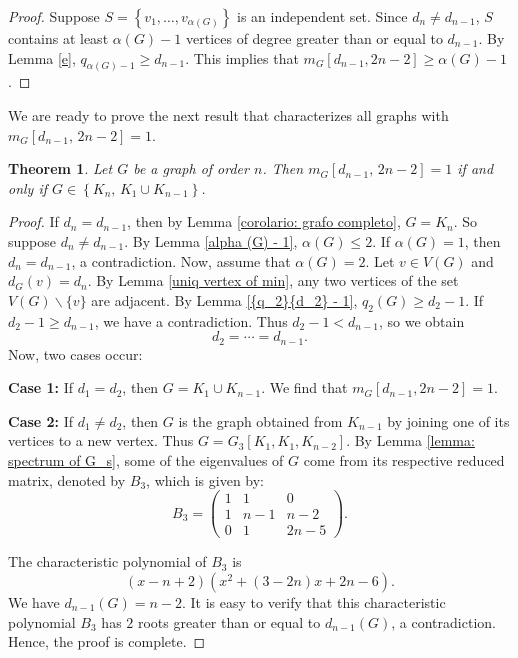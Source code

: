\documentclass[preprint,12pt]{elsarticle}
\newtheorem{theorem}{Theorem}[section]
\begin{document}
\begin{proof}
 Suppose $S = \left\{ {{v_1}, \ldots ,{v_{\alpha (G)}}} \right\}$ is an independent set. Since ${d_n} \ne {d_{n - 1}}$, $S$ contains at least $\alpha (G) - 1$ vertices of degree greater than or equal to ${d_{n - 1}}$. By Lemma \ref{e}, ${q_{\alpha (G) - 1}} \ge {d_{n - 1}}$. This implies that ${m_G}\left[ {{d_{n - 1}},2n - 2} \right] \ge \alpha (G) - 1$.
\end{proof}

We are ready to prove the next result that characterizes all graphs with $m_{G}[{d_{n-1}},\,2n-2] = 1$.

\begin{theorem}
Let $G$ be a graph of order $n$. Then ${m_G}[{d_{n - 1}},\,2n-2] = 1$ if and only if $G \in \left\{ {{K_n},\,{K_1} \cup {K_{n - 1}}} \right\}$.
\end{theorem}

\begin{proof}
If ${d_n} = {d_{n - 1}}$, then by Lemma \ref{corolario: grafo completo}, $G = {K_n}$. So suppose ${d_n} \ne {d_{n - 1}}$. By Lemma \ref{alpha (G) - 1}, $\alpha (G) \le 2$. If $\alpha (G) = 1$, then ${d_n} = {d_{n - 1}}$, a contradiction. Now, assume that $\alpha (G) = 2$. Let $v \in V(G)$ and ${d_G}(v) = {d_n}$. By Lemma \ref{uniq vertex of min}, any two vertices of the set $V(G)\backslash \{ v\} $ are adjacent. By Lemma \ref{{q_2}{d_2} - 1}, ${q_2(G)} \ge {d_2} - 1$. If ${d_2} - 1 \ge {d_{n - 1}}$, we have a contradiction. Thus ${d_2} - 1 < {d_{n - 1}}$, so we obtain 
$${d_2} = \cdots = {d_{n - 1}}.$$
Now, two cases occur:

 \noindent\textbf{Case 1:} If ${d_1} = {d_2}$, then $G = {K_1} \cup {K_{n - 1}}$. We find that ${m_G}\left[ {{d_{n - 1}},2n - 2} \right] = 1$.
 
 \noindent\textbf{Case 2:} If ${d_1} \ne {d_2}$, then $G$ is the graph obtained from ${K_{n - 1}}$ by joining one of its vertices to a new vertex. Thus $G = {G_3}\left[ {{K_1},{K_1},{K_{n - 2}}} \right]$. By Lemma \ref{lemma: spectrum of G_s}, some of the eigenvalues of $G$ come from its respective reduced matrix, denoted by ${B_3}$, which is given by:
\[
B_3 = \begin{pmatrix}
1 & 1 & 0 \\
1 & n-1 & n-2 \\
0 & 1 & 2n - 5
\end{pmatrix}.
\]

The characteristic polynomial of ${B_3}$ is 
$$\left( {x - n + 2} \right)\left( {{x^2} + (3 - 2n)x + 2n - 6} \right).$$
We have ${d_{n - 1}}(G) = n - 2$. It is easy to verify that this characteristic polynomial ${B_3}$ has $2$ roots greater than or equal to ${d_{n - 1}}(G)$, a contradiction. Hence, the proof is complete.
\end{proof}
\end{document}
